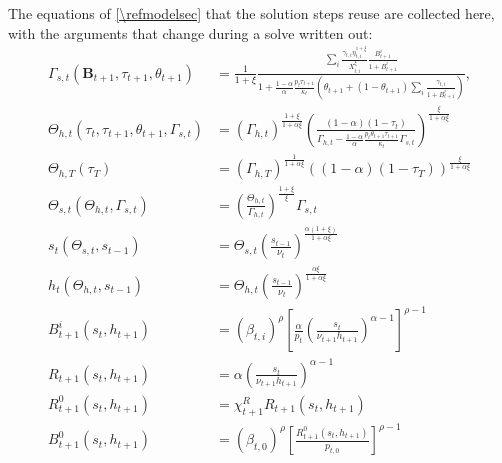 The equations of \cref{\refmodelsec} that the solution steps reuse are collected here, with the arguments that change during a solve written out:
\begin{subequations}\label{\refeq:auxiliary}
    \begin{align}
        \Gamma_{s,t}\left(\bm{B}_{t+1}, \tau_{t+1}, \theta_{t+1} \right) &= \frac{1}{1+\xi}\frac{\sum_i \frac{\gamma_{t,i}\eta_{t,i}^{1+\xi}}{X_{t,i}^{\xi}}\frac{B_{t+1}^i}{1+B_{t+1}^i}}{1+\frac{1-\alpha}{\alpha}\frac{p_t\tau_{t+1}}{\kappa_t}\left(\theta_{t+1}+(1-\theta_{t+1})\sum_i\frac{\gamma_{t,i}}{1+B_{t+1}^i}\right)},
        \label{\refeq:auxiliary:Gammas} \\
        \Theta_{h,t}\left(\tau_t, \tau_{t+1}, \theta_{t+1}, \Gamma_{s,t}\right) &= \left(\Gamma_{h,t}\right)^{\frac{1+\xi}{1+\alpha\xi}}\left(\frac{(1-\alpha)(1-\tau_t)}{\Gamma_{h,t}-\frac{1-\alpha}{\alpha}\frac{p_t\theta_{t+1}\tau_{t+1}}{\kappa_t}\Gamma_{s,t}}\right)^{\frac{\xi}{1+\alpha\xi}}
        \label{\refeq:auxiliary:Thetah} \\
        \Theta_{h,T}\left(\tau_T\right) &= \left(\Gamma_{h,T}\right)^{\frac{1}{1+\alpha\xi}}\left((1-\alpha)(1-\tau_T)\right)^{\frac{\xi}{1+\alpha\xi}}
        \label{\refeq:auxiliary:ThetahT} \\
        \Theta_{s,t}\left(\Theta_{h,t}, \Gamma_{s,t}\right) &= \left(\frac{\Theta_{h,t}}{\Gamma_{h,t}}\right)^{\frac{1+\xi}{\xi}} \Gamma_{s,t}
        \label{\refeq:auxiliary:Thetas} \\
        s_t(\Theta_{s,t}, s_{t-1}) &= \Theta_{s,t} \left(\frac{s_{t-1}}{\nu_t}\right)^{\frac{\alpha(1+\xi)}{1+\alpha\xi}}
        \label{\refeq:auxiliary:s} \\
        h_t\left(\Theta_{h,t}, s_{t-1}\right) &= \Theta_{h,t}\left(\frac{s_{t-1}}{\nu_t}\right)^{\frac{\alpha\xi}{1+\alpha\xi}} \label{\refeq:auxiliary:h} \\
        B_{t+1}^i\left(s_t, h_{t+1}\right) &=\left(\beta_{t,i}\right)^{\rho}\left[\frac{\alpha}{p_t}\left(\frac{s_t}{\nu_{t+1}h_{t+1}}\right)^{\alpha-1}\right]^{\rho-1}
        \label{\refeq:auxiliary:B} \\
        R_{t+1}\left(s_t, h_{t+1}\right) &= \alpha \left(\frac{s_t}{\nu_{t+1}h_{t+1}}\right)^{\alpha-1} \label{\refeq:auxiliary:R} \\
        R_{t+1}^0\left(s_t, h_{t+1}\right) &= \chi_{t+1}^R R_{t+1}\left(s_t, h_{t+1}\right) \label{\refeq:auxiliary:R0} \\
        B_{t+1}^0\left(s_t, h_{t+1}\right) &= \left(\beta_{t,0}\right)^{\rho}\left[\frac{R_{t+1}^0\left(s_t, h_{t+1}\right)}{p_{t,0}}\right]^{\rho-1} \label{\refeq:auxiliary:B0} \\

\end{align}
\end{subequations}
